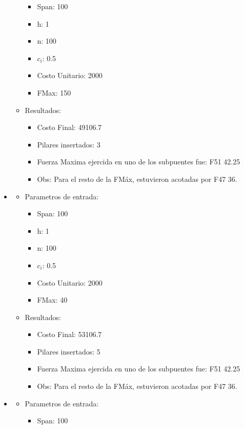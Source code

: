 \begin{itemize}
\begin{itemize}
\begin{itemize}
	    \item Span: 100
	    \item h: 1
	    \item n: 100
	    \item $c_i$: 0.5
	    \item Costo Unitario: 2000
	    \item FMax: 150
	  \end{itemize}
      \item Resultados:
	  \begin{itemize}
	    \item Costo Final: 49106.7
	    \item Pilares insertados: 3
	    \item Fuerza Maxima ejercida en uno de los subpuentes fue: F51 42.25
	    \item Obs: Para el resto de la FM\'ax, estuvieron acotadas por F47 36.
	  \end{itemize}
      \end{itemize}
\item
  \begin{itemize}
    \item Parametros de entrada:
	  \begin{itemize}
	    \item Span: 100
	    \item h: 1
	    \item n: 100
	    \item $c_i$: 0.5
	    \item Costo Unitario: 2000
	    \item FMax: 40
	  \end{itemize}
      \item Resultados:
	  \begin{itemize}
	    \item Costo Final: 53106.7
	    \item Pilares insertados: 5
	    \item Fuerza Maxima ejercida en uno de los subpuentes fue: F51 42.25
	    \item Obs: Para el resto de la FM\'ax, estuvieron acotadas por F47 36.
	  \end{itemize}
      \end{itemize}
\item
  \begin{itemize}
    \item Parametros de entrada:
	  \begin{itemize}
	    \item Span: 100

\end{itemize}
\end{itemize}
\end{itemize}
